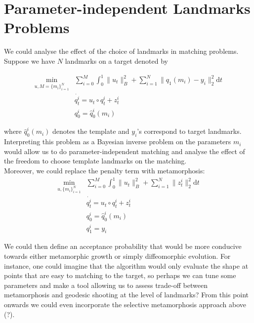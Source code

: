 \documentclass{article}
\newcommand{\norm}[2]{\| #1 \|_{ #2 }}
\newcommand{\bnorm}[1]{\norm{ #1 }{B}}
\newcommand{\ltwonorm}[1]{\norm{ #1 }{2}}
\newcommand{\diff}[1]{\text{d} #1}
\begin{document}
\section{Parameter-independent Landmarks Problems}

We could analyse the effect of the choice of landmarks in matching problems.
Suppose we have $N$ landmarks on a target denoted by 

\begin{subequations}
\begin{align}
\min_{u, M=\{m_i\}_{i=1}^N} & \sum_{i=0}^M \int_0^1 \bnorm{u_t}^2 + \sum_{i=1}^N \ltwonorm{q_1(m_i)-y_i}^2 \diff{t}\\
            & \dot{q^i_t} = u_t \circ q^i_t + z^i_t\\
            & q^i_0 = \hat q^i_0(m_i)
\end{align}
\end{subequations}

where $\hat q^i_0(m_i)$ denotes the template and $y_i$'s correspond to target
landmarks. Interpreting this problem as a Bayesian inverse problem on the
parameters $m_i$ would allow us to do parameter-independent matching and analyse
the effect of the freedom to choose template landmarks on the matching.\\

Moreover, we could replace the penalty term with metamorphosis:
\begin{subequations}
\begin{align}
\min_{u, \{m_i\}_{i=1}^N} & \sum_{i=0}^M \int_0^1 \bnorm{u_t}^2 + \sum_{i=1}^N
\ltwonorm{z_t^i}^2 \diff{t}\\
            & \dot{q^i_t} = u_t \circ q^i_t + z^i_t\\
            & q^i_0 = \hat q^i_0(m_i)\\
            & q^i_1 = y_i
\end{align}
\end{subequations}

We could then define an acceptance probability that would be more conducive
towards either metamorphic growth or simply diffeomorphic evolution. For
instance, one could imagine that the algorithm would only evaluate the shape at
points that are easy to matching to the target, so perhaps we can tune some
parameters and make a tool allowing us to assess trade-off between metamorphosis
and geodesic shooting at the level of landmarks? From this point onwards we
could even incorporate the selective metamorphosis approach above (?).\\
\end{document}
